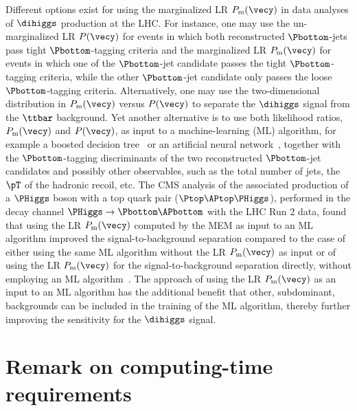 Different options exist for using the marginalized LR $P_{\textrm{m}}(\vecy)$ in data analyses of $\dihiggs$ production at the LHC.
For instance, one may use the un-marginalized LR $P(\vecy)$ for events in which both reconstructed $\Pbottom$-jets pass tight $\Pbottom$-tagging criteria
and the marginalized LR $P_{\textrm{m}}(\vecy)$ for events in which one of the $\Pbottom$-jet candidate passes the tight $\Pbottom$-tagging criteria,
while the other $\Pbottom$-jet candidate only passes the loose $\Pbottom$-tagging criteria.
Alternatively, one may use the two-dimensional distribution in $P_{\textrm{m}}(\vecy)$ versus $P(\vecy)$ to separate the $\dihiggs$ signal from the $\ttbar$ background.
Yet another alternative is to use both likelihood ratios, $P_{\textrm{m}}(\vecy)$ and $P(\vecy)$,
as input to a machine-learning (ML) algorithm, for example a boosted decision tree~\cite{BDT} or an artificial neural network~\cite{ANN},
together with the $\Pbottom$-tagging discriminants of the two reconstructed $\Pbottom$-jet candidates and possibly other observables,
such as the total number of jets, the $\pT$ of the hadronic recoil, etc.
The CMS analysis of the associated production of a $\PHiggs$ boson with a top quark pair ($\Ptop\APtop\PHiggs$),
performed in the decay channel $\PHiggs \to \Pbottom\APbottom$ with the LHC Run $2$ data,
found that using the LR $P_{\textrm{m}}(\vecy)$ computed by the MEM as input to an ML algorithm
improved the signal-to-background separation compared to the case of either using the same ML algorithm without the LR $P_{\textrm{m}}(\vecy)$ as input
or of using the LR $P_{\textrm{m}}(\vecy)$ for the signal-to-background separation directly, without employing an ML algorithm~\cite{Sirunyan:2018mvw}.
The approach of using the LR $P_{\textrm{m}}(\vecy)$ as an input to an ML algorithm has the additional benefit
that other, subdominant, backgrounds can be included in the training of the ML algorithm, thereby further improving the sensitivity for the $\dihiggs$ signal.


\section{Remark on computing-time requirements}

